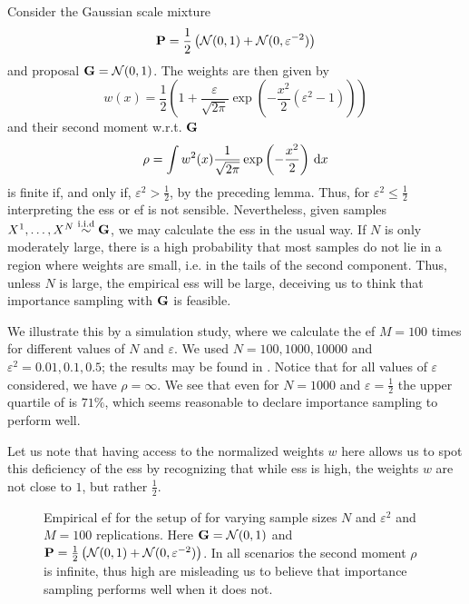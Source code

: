 \begin{example}
    \label{ex:ess_failure}
    Consider the Gaussian scale mixture
    $$
    \P = \frac{1}{2} \left(\mathcal N (0,1) + \mathcal N(0, \varepsilon^{-2})\right)
    $$
    and proposal $\G = \mathcal N(0, 1)$. The weights are then given by 
    $$
        w(x) = \frac{1}{2} \left( 1 + \frac{\varepsilon}{\sqrt{2\pi}} \exp \left( - \frac{x^{2}}{2} \left( \varepsilon^{2} - 1\right) \right)\right)
    $$ and their second moment w.r.t. $\G$ 
    $$
    \rho = \int w^{2}(x) \frac{1}{\sqrt{2\pi}} \exp \left( -\frac{x^{2}}{2} \right) \d x
    $$
    is finite if, and only if, $\varepsilon^{2} > \frac{1}{2}$, by the preceding lemma. Thus, for $\varepsilon^{2} \leq \frac{1}{2}$ interpreting the \acrshort{ess} or \acrshort{ef} is not sensible. Nevertheless, given samples $X^{1}, \dots, X^{N} \iid \G$, we may calculate the \acrshort{ess} in the usual way. If $N$ is only moderately large, there is a high probability that most samples do not lie in a region where weights are small, i.e. in the tails of the second component. Thus, unless $N$ is large, the empirical \acrshort{ess} will be large, deceiving us to think that importance sampling with $\G$ is feasible.

    We illustrate this by a simulation study, where we calculate the \acrshort{ef} $M=100$ times for different values of $N$ and $\varepsilon$. We used $N = 100, 1000, 10000$ and $\varepsilon^{2} = 0.01, 0.1, 0.5$; the results may be found in . Notice that for all values of $\varepsilon$ considered, we have $\rho = \infty$. We see that even for $N = 1000$ and $\varepsilon = \frac{1}{2}$ the upper quartile of  is $71\%$, which seems reasonable to declare importance sampling to perform well. 

    Let us note that having access to the normalized weights $w$ here allows us to spot this deficiency of the \acrshort{ess} by recognizing that while \acrshort{ess} is high, the weights $w$ are not close to $1$, but rather $\frac{1}{2}$.

    \begin{figure}
        \centering

        \resizebox{\textwidth}{!}{%
        }
        \caption{Empirical \acrshort{ef} for the setup of  for varying sample sizes $N$ and $\varepsilon^{2}$ and $M=100$ replications. Here $\G = \mathcal N(0,1)$ and $\P = \frac{1}{2} \left( \mathcal N (0,1) + \mathcal N(0, \varepsilon^{-2}) \right)$. In all scenarios the second moment $\rho$ is infinite, thus high  are misleading us to believe that importance sampling performs well when it does not.}
        \label{fig:ess_failure}
    \end{figure}

\end{example}

